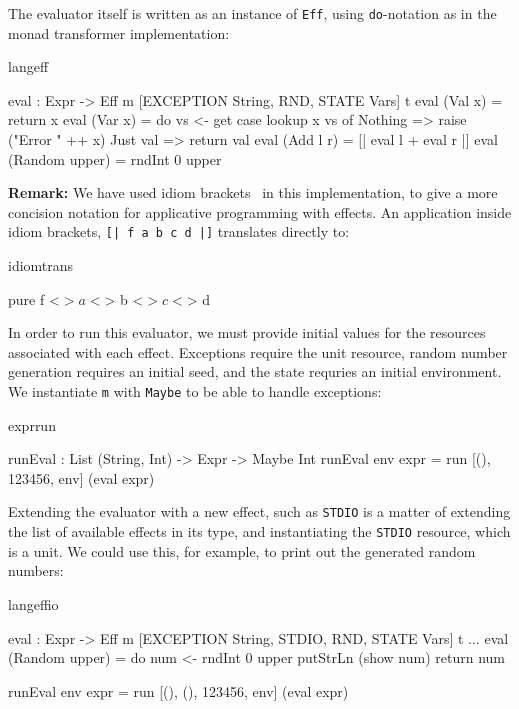 \noindent
The evaluator itself is written as an instance of \texttt{Eff}, using
\texttt{do}-notation as in the monad transformer implementation:


\begin{SaveVerbatim}{langeff}

eval : Expr -> 
       Eff m [EXCEPTION String, RND, STATE Vars] t
eval (Val x) = return x
eval (Var x) = 
    do vs <- get
       case lookup x vs of
            Nothing => raise ("Error " ++ x)
            Just val => return val
eval (Add l r) = [| eval l + eval r |]
eval (Random upper) = rndInt 0 upper

\end{SaveVerbatim}

\noindent
\textbf{Remark:}
We have used idiom brackets~\cite{McBride2007} in this implementation, to
give a more concision notation for applicative programming with effects.
An application inside idiom brackets, \texttt{[| f a b c d |]} translates
directly to:

\begin{SaveVerbatim}{idiomtrans}

pure f <$> a <$> b <$> c <$> d

\end{SaveVerbatim}

\noindent
In order to run this evaluator, we must provide initial values for the resources
associated with each effect. Exceptions require the unit resource, random
number generation requires an initial seed, and the state requries an initial
environment. We instantiate \texttt{m} with \texttt{Maybe} to be able
to handle exceptions:

\begin{SaveVerbatim}{exprrun}

runEval : List (String, Int) -> Expr -> Maybe Int
runEval env expr = run [(), 123456, env] (eval expr)

\end{SaveVerbatim}

\noindent
Extending the evaluator with a new effect, such as \texttt{STDIO} is a matter
of extending the list of available effects in its type, and instantiating 
the \texttt{STDIO} resource, which is a unit. We could use this, for example,
to print out the generated random numbers:

\begin{SaveVerbatim}{langeffio}

eval : Expr -> 
       Eff m [EXCEPTION String, STDIO, 
              RND, STATE Vars] t
...
eval (Random upper) = do num <- rndInt 0 upper
                         putStrLn (show num)
                         return num

runEval env expr = run [(), (), 123456, env] (eval expr)

\end{SaveVerbatim}

